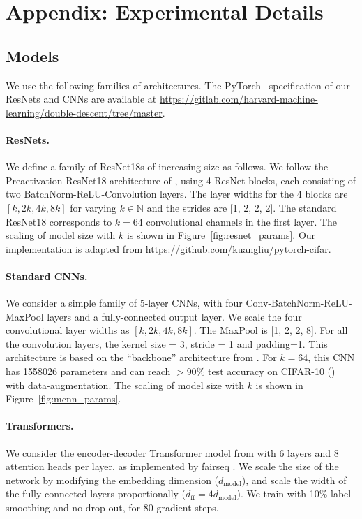 


\section{Appendix: Experimental Details}
\label{sec:appendix_exp_details}

\subsection{Models}
We use the following families of architectures.
The PyTorch~\cite{paszke2017automatic} specification of our ResNets and CNNs
are available at \url{https://gitlab.com/harvard-machine-learning/double-descent/tree/master}.

\paragraph{ResNets.}
We define a family of ResNet18s of increasing size as follows.
We follow the Preactivation ResNet18 architecture of \cite{he2016identity},
using 4 ResNet blocks, each consisting of two BatchNorm-ReLU-Convolution layers. The layer widths for the 4 blocks are $[k, 2k, 4k, 8k]$ for varying $k \in \mathbb{N}$ and the strides are [1, 2, 2, 2].
The standard ResNet18 corresponds to $k=64$ convolutional channels in the first layer.
The scaling of model size with $k$ is shown in Figure~\ref{fig:resnet_params}.
Our implementation is adapted from \url{https://github.com/kuangliu/pytorch-cifar}.

\paragraph{Standard CNNs.}
We consider a simple family of 5-layer CNNs,
with four Conv-BatchNorm-ReLU-MaxPool layers and a fully-connected output layer.
We scale the four convolutional layer widths as $[k, 2k, 4k, 8k]$. The MaxPool is [1, 2, 2, 8]. For all the convolution layers, the kernel size = 3, stride = 1 and padding=1. 
This architecture is based on the ``backbone'' architecture from 
\cite{mcnn}.
For $k=64$, this CNN has 1558026 parameters and can reach $>90\%$ test accuracy on CIFAR-10 (\cite{cifar}) with data-augmentation.
The scaling of model size with $k$ is shown in Figure~\ref{fig:mcnn_params}.


\paragraph{Transformers.}
We consider the encoder-decoder Transformer model from \cite{Vaswani}
with 6 layers and 8 attention heads per layer, as implemented by fairseq \cite{ott2019fairseq}.
We scale the size of the network by modifying the embedding dimension ($d_{\text{model}}$),
and scale the width of the fully-connected layers proportionally ($d_{\text{ff}} = 4 d_{\text{model}}$).
We train with 10\% label smoothing and no drop-out, for 80 gradient steps.

